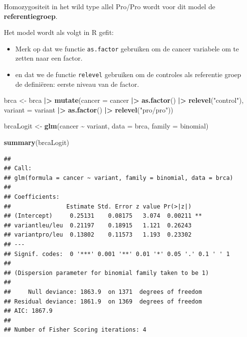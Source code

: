 \documentclass[
  12pt,dutch]{book}
\newenvironment{Shaded}{\begin{snugshade}}{\end{snugshade}}
\newcommand{\AttributeTok}[1]{\textcolor[rgb]{0.13,0.29,0.53}{#1}}
\newcommand{\FunctionTok}[1]{\textcolor[rgb]{0.13,0.29,0.53}{\textbf{#1}}}
\newcommand{\NormalTok}[1]{#1}
\newcommand{\OtherTok}[1]{\textcolor[rgb]{0.56,0.35,0.01}{#1}}
\newcommand{\SpecialCharTok}[1]{\textcolor[rgb]{0.81,0.36,0.00}{\textbf{#1}}}
\newcommand{\StringTok}[1]{\textcolor[rgb]{0.31,0.60,0.02}{#1}}
\providecommand{\tightlist}{%
  \setlength{\itemsep}{0pt}\setlength{\parskip}{0pt}}
\theoremstyle{definition}
\theoremstyle{definition}
\theoremstyle{definition}
\theoremstyle{definition}
\theoremstyle{remark}
\begin{document}
Homozygositeit in het wild type allel Pro/Pro wordt voor dit model de \textbf{referentiegroep}.

Het model wordt als volgt in R gefit:

\begin{itemize}
\tightlist
\item
  Merk op dat we functie \texttt{as.factor} gebruiken om de cancer variabele om te zetten naar een factor.
\item
  en dat we de functie \texttt{relevel} gebruiken om de controles als referentie groep de definiëren: eerste niveau van de factor.
\end{itemize}

\begin{Shaded}
\begin{Highlighting}[]
\NormalTok{brca }\OtherTok{\textless{}{-}}\NormalTok{ brca }\SpecialCharTok{|\textgreater{}}
    \FunctionTok{mutate}\NormalTok{(}\AttributeTok{cancer =}\NormalTok{ cancer }\SpecialCharTok{|\textgreater{}}
        \FunctionTok{as.factor}\NormalTok{() }\SpecialCharTok{|\textgreater{}}
        \FunctionTok{relevel}\NormalTok{(}\StringTok{"control"}\NormalTok{), }\AttributeTok{variant =}\NormalTok{ variant }\SpecialCharTok{|\textgreater{}}
        \FunctionTok{as.factor}\NormalTok{() }\SpecialCharTok{|\textgreater{}}
        \FunctionTok{relevel}\NormalTok{(}\StringTok{"pro/pro"}\NormalTok{))}

\NormalTok{brcaLogit }\OtherTok{\textless{}{-}} \FunctionTok{glm}\NormalTok{(cancer }\SpecialCharTok{\textasciitilde{}}\NormalTok{ variant, }\AttributeTok{data =}\NormalTok{ brca, }\AttributeTok{family =}\NormalTok{ binomial)}

\FunctionTok{summary}\NormalTok{(brcaLogit)}
\end{Highlighting}
\end{Shaded}

\begin{verbatim}
## 
## Call:
## glm(formula = cancer ~ variant, family = binomial, data = brca)
## 
## Coefficients:
##                Estimate Std. Error z value Pr(>|z|)   
## (Intercept)     0.25131    0.08175   3.074  0.00211 **
## variantleu/leu  0.21197    0.18915   1.121  0.26243   
## variantpro/leu  0.13802    0.11573   1.193  0.23302   
## ---
## Signif. codes:  0 '***' 0.001 '**' 0.01 '*' 0.05 '.' 0.1 ' ' 1
## 
## (Dispersion parameter for binomial family taken to be 1)
## 
##     Null deviance: 1863.9  on 1371  degrees of freedom
## Residual deviance: 1861.9  on 1369  degrees of freedom
## AIC: 1867.9
## 
## Number of Fisher Scoring iterations: 4
\end{verbatim}
\end{document}
